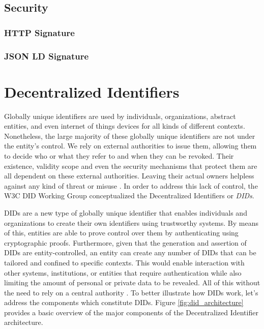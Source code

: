 \subsection{Security}

\subsubsection{HTTP Signature}

\subsubsection{JSON LD Signature}



\section{Decentralized Identifiers} \label{section:dids}

Globally unique identifiers are used by individuals, organizations, abstract entities, and even internet of things devices for all kinds of different contexts. Nonetheless, the large majority of these globally unique identifiers are not under the entity's control. We rely on external authorities to issue them, allowing them to decide who or what they refer to and when they can be revoked. Their existence, validity scope and even the security mechanisms that protect them are all dependent on these external authorities. Leaving their actual owners helpless against any kind of threat or misuse \cite{sporny_longley_sabadello_reed_steele_2021}. In order to address this lack of control, the W3C DID Working Group conceptualized the Decentralized Identifiers or \emph{DIDs}.

DIDs are a new type of globally unique identifier that enables individuals and organizations to create their own identifiers using trustworthy systems. By means of this, entities are able to prove control over them by authenticating using cryptographic proofs. Furthermore, given that the generation and assertion of DIDs are entity-controlled, an entity can create any number of DIDs that can be tailored and confined to specific contexts. This would enable interaction with other systems, institutions, or entities that require authentication while also limiting the amount of personal or private data to be revealed. All of this without the need to rely on a central authority \cite{sporny_longley_sabadello_reed_steele_2021}. To better illustrate how DIDs work, let's address the components which constitute DIDs. Figure \ref{fig:did_architecture} provides a basic overview of the major components of the Decentralized Identifier architecture.

